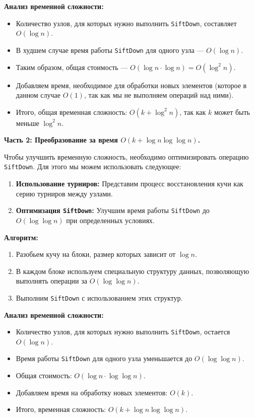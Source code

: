 \documentclass[11pt]{article}
\begin{document}
\begin{solution}
    \textbf{Анализ временной сложности:}

    \begin{itemize}
        \item Количество узлов, для которых нужно выполнить \texttt{SiftDown}, составляет $O(\log n)$.
        \item В худшем случае время работы \texttt{SiftDown} для одного узла — $O(\log n)$.
        \item Таким образом, общая стоимость — $O(\log n \cdot \log n) = O(\log^2 n)$.
        \item Добавляем время, необходимое для обработки новых элементов (которое в данном случае $O(1)$, так как мы не выполняем операций над ними).
        \item Итого, общая временная сложность: $O(k + \log^2 n)$, так как $k$ может быть меньше $\log^2 n$.
    \end{itemize}

    \textbf{Часть 2: Преобразование за время $O(k + \log n \log \log n)$.}

    Чтобы улучшить временную сложность, необходимо оптимизировать операцию \texttt{SiftDown}. Для этого мы можем использовать следующее:

    \begin{enumerate}
        \item \textbf{Использование турниров:} Представим процесс восстановления кучи как серию турниров между узлами.
        \item \textbf{Оптимизация \texttt{SiftDown}:} Улучшим время работы \texttt{SiftDown} до $O(\log \log n)$ при определенных условиях.
    \end{enumerate}

    \textbf{Алгоритм:}

    \begin{enumerate}
        \item Разобьем кучу на блоки, размер которых зависит от $\log n$.
        \item В каждом блоке используем специальную структуру данных, позволяющую выполнять операции за $O(\log \log n)$.
        \item Выполним \texttt{SiftDown} с использованием этих структур.
    \end{enumerate}

    \textbf{Анализ временной сложности:}

    \begin{itemize}
        \item Количество узлов, для которых нужно выполнить \texttt{SiftDown}, остается $O(\log n)$.
        \item Время работы \texttt{SiftDown} для одного узла уменьшается до $O(\log \log n)$.
        \item Общая стоимость: $O(\log n \cdot \log \log n)$.
        \item Добавляем время на обработку новых элементов: $O(k)$.
        \item Итого, временная сложность: $O(k + \log n \log \log n)$.
    \end{itemize}

\end{solution}
\end{document}

